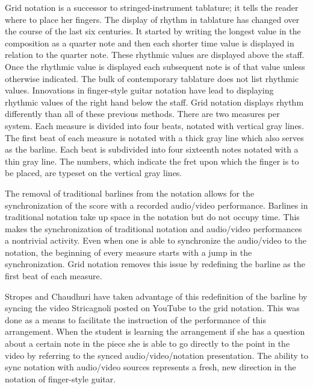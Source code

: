 \documentclass{tufte-handout}
\begin{document}
Grid notation is a successor to stringed-instrument tablature; it tells the reader where to place her fingers. The display of rhythm in tablature has changed over the course of the last six centuries. It started by writing the longest value in the composition as a quarter note and then each shorter time value is displayed in relation to the quarter note. These rhythmic values are displayed above the staff. Once the rhythmic value is displayed each subsequent note is of that value unless otherwise indicated.  The bulk of contemporary tablature does not list rhythmic values. Innovations in finger-style guitar notation have lead to displaying rhythmic values of the right hand below the staff. Grid notation displays rhythm differently than all of these previous methods. There are two measures per system. Each measure is divided into four beats, notated with vertical gray lines. The first beat of each measure is notated with a thick gray line which also serves as the barline. Each beat is subdivided into four sixteenth notes notated with a thin gray line. The numbers, which indicate the fret upon which the finger is to be placed, are typeset on the vertical gray lines.

The removal of traditional barlines from the notation allows for the synchronization of the score with a recorded audio/video performance. Barlines in traditional notation take up space in the notation but do not occupy time. This makes the synchronization of traditional notation and audio/video performances a nontrivial activity. Even when one is able to synchronize the audio/video to the notation, the beginning of every measure starts with a jump in the synchronization. Grid notation removes this issue by redefining the barline as the first beat of each measure.

Stropes and Chaudhuri have taken advantage of this redefinition of the barline by syncing the video Stricagnoli posted on YouTube to the grid notation. This was done as a means to facilitate the instruction of the performance of this arrangement. When the student is learning the arrangement if she has a question about a certain note in the piece she is able to go directly to the point in the video by referring to the synced audio/video/notation presentation. The ability to sync notation with audio/video sources represents a fresh, new direction in the notation of finger-style guitar.
\end{document}
